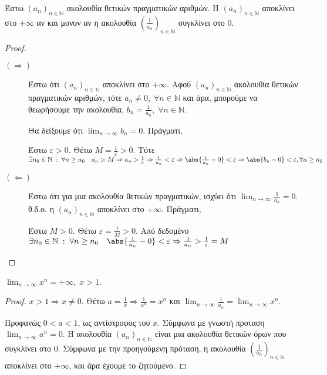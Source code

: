 \documentclass[main.tex]{subfiles}
\begin{document}
\begin{prop}
    Έστω $ (a_{n})_{n \in \mathbb{N}} $ ακολουθία θετικών 
    πραγματικών αριθμών. 
    Η $ (a_{n})_{n \in \mathbb{N}} $ αποκλίνει στο $ + \infty $ αν και 
    μονον αν η ακολουθία 
    $ \left(\frac{1}{a_{n}} \right)_{n \in \mathbb{N}} $ συγκλίνει 
    στο 0.
\end{prop}


\begin{proof}
\item {}
    \begin{description}
        \item[$ (\Rightarrow) $] Έστω ότι $ (a_{n})_{n \in \mathbb{N}} $ 
            αποκλίνει στο $ + \infty $. Αφού $ (a_{n})_{n \in \mathbb{N}} $
            ακολουθία θετικών πραγματικών αριθμών, τότε $ a_{n} \neq 0, 
            \; \forall n \in \mathbb{N}$ και άρα, μπορούμε να θεωρήσουμε 
            την ακολουθία, $ b_{n} = \frac{1}{a_{n}}, \; \forall n \in
            \mathbb{N}  $. 

            Θα δείξουμε ότι $ \lim_{n \to \infty} b_{n} = 0 $. Πράγματι,

            Έστω $ \varepsilon >0 $. Θέτω $ M = \frac{1}{\varepsilon} >0 $.
            Τότε $ \exists n_{0} \in \mathbb{N} \; : \; \forall n \geq 
            n_{0} \quad a_{n}> M \Rightarrow a_{n} > \frac{1}{\varepsilon} 
            \Rightarrow \frac{1}{a_{n}} < \varepsilon \Rightarrow
            \abs{\frac{1}{a_{n}} - 0} < \varepsilon \Rightarrow 
            \abs{b_{n}-0} < \varepsilon, \forall n \geq n_{0} $

        \item [$ ( \Leftarrow) $]
            Έστω ότι για μια ακολουθία θετικών πραγματικών, ισχύει ότι 
            $ \lim_{n \to \infty} \frac{1}{a_{n}} = 0$. θ.δ.ο. η $ 
            (a_{n})_{n \in \mathbb{N}}$ αποκλίνει στο $ + \infty $. Πράγματι,

            Έστω $ M > 0 $. Θέτω $ \varepsilon = \frac{1}{M} > 0 $. Από 
            δεδομένο $ \exists n_{0} \in \mathbb{N} \; : \; \forall n \geq 
            n_{0} \quad \abs{\frac{1}{a_{n}} - 0} < \varepsilon \Rightarrow
            \frac{1}{a_{n}} > \frac{1}{\varepsilon}=M $
    \end{description}
\end{proof}

\begin{prop}
    $ \lim_{n \to \infty} x^{n} = +\infty, \; x >1 $.
\end{prop}

\begin{proof}
\item {}
    $ x >1 \Rightarrow x \neq 0 $. Θέτω  $a = \frac{1}{x} \Rightarrow 
    \frac{1}{a^{n}} = x^{n} $ και $ \lim_{n \to \infty} \frac{1}{a_{n}} = 
    \lim_{n \to \infty}x^{n}$.

    Προφανώς $ 0 < a <1 $, ως αντίστροφος του $x$. Σύμφωνα με γνωστή προταση
    $ \lim_{n \to \infty} a^{n} = 0 $. Η ακολουθία $ (a_{n})_{n \in \mathbb{N}}
    $ είναι μια ακολουθία θετικών όρων που συγκλίνει στο 0. Σύμφωνα με 
    την προηγούμενη πρόταση, η ακολουθία $ \left(\frac{1}{a_{n}}\right)_{n 
    \in \mathbb{N}} $ αποκλίνει στο $ + \infty $, και άρα έχουμε το ζητούμενο.
\end{proof}
\end{document}
